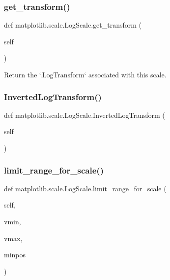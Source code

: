 \subsubsection{\texorpdfstring{get\+\_\+transform()}{get\_transform()}}
{\footnotesize\ttfamily def matplotlib.\+scale.\+Log\+Scale.\+get\+\_\+transform (\begin{DoxyParamCaption}\item[{}]{self }\end{DoxyParamCaption})}

\begin{DoxyVerb}Return the `.LogTransform` associated with this scale.\end{DoxyVerb}
 \mbox{\label{classmatplotlib_1_1scale_1_1LogScale_a18b84bbc3e4693ac3264c0e6a80d27cb}} 
\subsubsection{\texorpdfstring{Inverted\+Log\+Transform()}{InvertedLogTransform()}}
{\footnotesize\ttfamily def matplotlib.\+scale.\+Log\+Scale.\+Inverted\+Log\+Transform (\begin{DoxyParamCaption}\item[{}]{self }\end{DoxyParamCaption})}

\mbox{\label{classmatplotlib_1_1scale_1_1LogScale_a404bb8d2c35a58536ef53bc5c271e5be}} 
\subsubsection{\texorpdfstring{limit\+\_\+range\+\_\+for\+\_\+scale()}{limit\_range\_for\_scale()}}
{\footnotesize\ttfamily def matplotlib.\+scale.\+Log\+Scale.\+limit\+\_\+range\+\_\+for\+\_\+scale (\begin{DoxyParamCaption}\item[{}]{self,  }\item[{}]{vmin,  }\item[{}]{vmax,  }\item[{}]{minpos }\end{DoxyParamCaption})}

